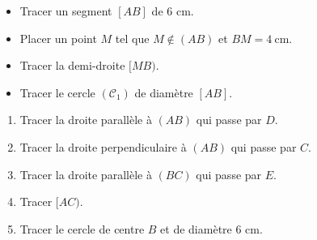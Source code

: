\exo{}

\begin{itemize}[itemsep=1em]
	\item Tracer un segment $[AB]$ de 6 cm.
	\item Placer un point $M$ tel que $M\not\in(AB)$ et $BM=4~\text{cm}$.
	\item Tracer la demi-droite $[MB)$.
	\item Tracer le cercle $(\mathcal{C}_1)$ de diamètre $[AB]$.
\end{itemize}


\exo{}

\begin{enumerate}[leftmargin=2cm]
	\item Tracer la droite parallèle à $(AB)$ qui passe par $D$.
	\item Tracer la droite perpendiculaire à $(AB)$ qui passe par $C$.
	\item Tracer la droite parallèle à $(BC)$ qui passe par $E$.
	\item Tracer $[AC)$.
	\item Tracer le cercle de centre $B$ et de diamètre 6 cm.
\end{enumerate}

\bigskip

\begin{center}
\end{center}

\vspace{3cm}
$\phantom{X}$
